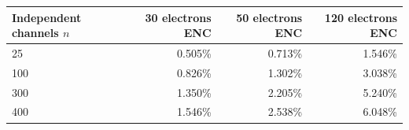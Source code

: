 \begin{tabular}{lrrr}\toprule
Independent channels $n$ & 30 electrons ENC & 50 electrons ENC & 120 electrons ENC\\\midrule
25 & 0.505\% & 0.713\% & 1.546\%\\
100 & 0.826\% & 1.302\% & 3.038\%\\
300 & 1.350\% & 2.205\% & 5.240\%\\
400 & 1.546\% & 2.538\% & 6.048\%\\
\bottomrule\end{tabular}
